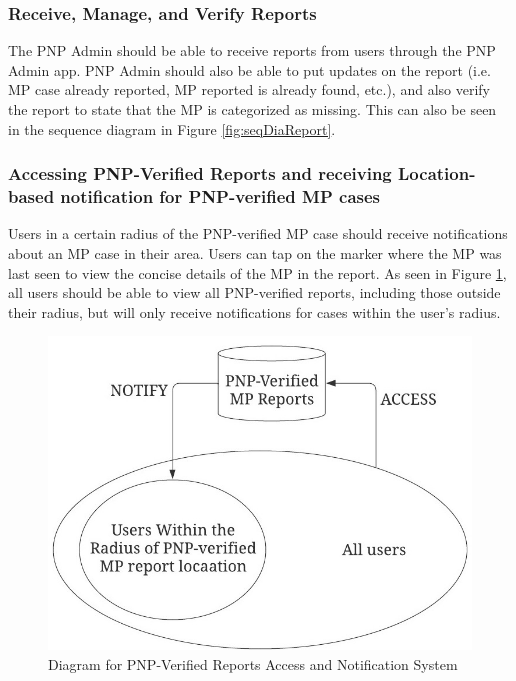 \subsubsection{Receive, Manage, and Verify Reports}

The PNP Admin should be able to receive reports from users through the PNP Admin app. PNP Admin should also be able to put updates on the report (i.e. MP case already reported, MP reported is already found, etc.), and also verify the report to state that the MP is categorized as missing. This can also be seen in the sequence diagram in Figure \ref{fig:seqDiaReport}. 

\subsubsection{Accessing PNP-Verified Reports and receiving Location-based notification for PNP-verified MP cases}

Users in a certain radius of the PNP-verified MP case  should receive notifications about an MP case in their area. Users can tap on the marker where the MP was last seen to view the concise details of the MP in the report. As seen in Figure \ref{fig:diagramLocation}, all users should be able to view all PNP-verified reports, including those outside their radius, but will only receive notifications for cases within the user's radius.

\begin{figure}[!h]
    \centering
    \includegraphics[scale = 1.50]{figures/Chapter3/Chapt3_Diag_locationBasedNotif.jpeg}
    \caption{Diagram for PNP-Verified Reports Access and Notification System}
    \label{fig:diagramLocation}
\end{figure}

